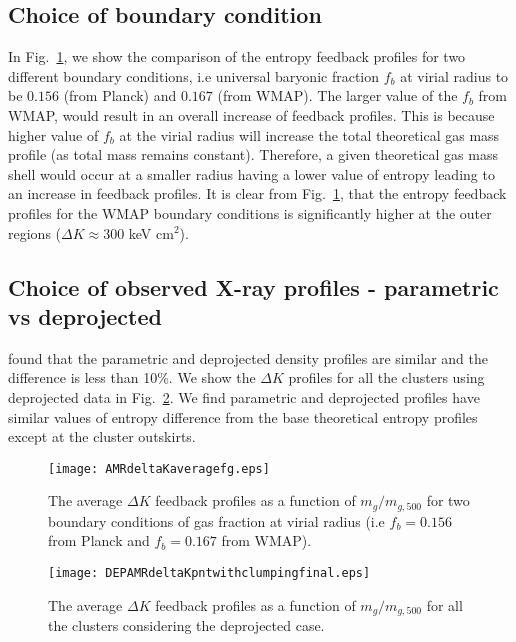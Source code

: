 \documentclass[a4paper,fleqn,usenatbib]{mnras}
\begin{document}
\subsection{Choice of boundary condition}
In Fig.~\ref{fig:Deprojected}, we show the comparison of the entropy feedback profiles for two different boundary conditions, i.e universal baryonic fraction $f_b$ at virial radius to be $0.156$ (from Planck) and $0.167$ (from WMAP). The larger value of the $f_b$
from WMAP, would result in an overall increase of feedback profiles. This is because higher value of $f_b$ at the virial radius will increase the total theoretical gas mass profile (as total mass remains constant). Therefore, a given theoretical gas mass shell would occur at a smaller radius having a lower value of entropy leading to an increase in feedback profiles. It is clear from Fig.~\ref{fig:Deprojected}, that the  entropy feedback profiles for the WMAP boundary conditions is significantly higher at the outer regions ($\Delta K\approx300$ keV cm$^2$).
\subsection{Choice of observed X-ray profiles - parametric vs deprojected}
\cite{Eckert2013a}  found that the parametric and deprojected density profiles are  similar and the difference is less than 10\%. We show the $\Delta K$ profiles for all the clusters using deprojected data in Fig.~\ref{fig:withfg}. We find parametric and deprojected profiles have similar values of entropy difference from the base theoretical entropy profiles except at the cluster outskirts.   
\begin{figure}
\begin{minipage}{8.5cm}
\texttt{[image: AMRdeltaKaveragefg.eps]}
\end{minipage}
\caption{The average $\Delta K$ feedback profiles as a function of  $m_g/m_{g,500}$ for two boundary conditions of gas fraction at virial radius (i.e $f_{b}=0.156$ from Planck and $f_{b}=0.167$ from WMAP).}
\label{fig:Deprojected}
\end{figure} 



\begin{figure}
\begin{minipage}{8.5cm}
\texttt{[image: DEPAMRdeltaKpntwithclumpingfinal.eps]}
\end{minipage}
\caption{The average $\Delta K$ feedback profiles as a function  of $m_g/m_{g,500}$ for all the clusters considering the deprojected case.}
\label{fig:withfg}
\end{figure} 
\end{document}
